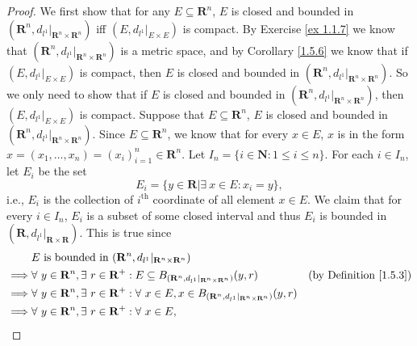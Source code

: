 \begin{proof}
    We first show that for any \(E \subseteq \mathbf{R}^n\), \(E\) is closed and bounded in \((\mathbf{R}^n, d_{l^1}|_{\mathbf{R}^n \times \mathbf{R}^n})\) iff \((E, d_{l^1}|_{E \times E})\) is compact.
    By Exercise \ref{ex 1.1.7} we know that \((\mathbf{R}^n, d_{l^1}|_{\mathbf{R}^n \times \mathbf{R}^n})\) is a metric space, and by Corollary \ref{1.5.6} we know that if \((E, d_{l^1}|_{E \times E})\) is compact, then \(E\) is closed and bounded in \((\mathbf{R}^n, d_{l^1}|_{\mathbf{R}^n \times \mathbf{R}^n})\).
    So we only need to show that if \(E\) is closed and bounded in \((\mathbf{R}^n, d_{l^1}|_{\mathbf{R}^n \times \mathbf{R}^n})\), then \((E, d_{l^1}|_{E \times E})\) is compact.
    Suppose that \(E \subseteq \mathbf{R}^n\), \(E\) is closed and bounded in \((\mathbf{R}^n, d_{l^1}|_{\mathbf{R}^n \times \mathbf{R}^n})\).
    Since \(E \subseteq \mathbf{R}^n\), we know that for every \(x \in E\), \(x\) is in the form \(x = (x_1, \dots, x_n) = (x_i)_{i = 1}^n \in \mathbf{R}^n\).
    Let \(I_n = \{i \in \mathbf{N} : 1 \leq i \leq n\}\).
    For each \(i \in I_n\), let \(E_i\) be the set
    \[
        E_i = \{y \in \mathbf{R} | \exists\ x \in E : x_i = y\},
    \]
    i.e., \(E_i\) is the collection of \(i^{\text{th}}\) coordinate of all element \(x \in E\).
    We claim that for every \(i \in I_n\), \(E_i\) is a subset of some closed interval and thus \(E_i\) is bounded in \((\mathbf{R}, d_{l^1}|_{\mathbf{R} \times \mathbf{R}})\).
    This is true since
    \begin{align*}
                 & E \text{ is bounded in } (\mathbf{R}^n, d_{l^1}|_{\mathbf{R}^n \times \mathbf{R}^n})                                                                                                          \\
        \implies & \forall\ y \in \mathbf{R}^n, \exists\ r \in \mathbf{R}^+ : E \subseteq B_{(\mathbf{R}^n, d_{l^1}|_{\mathbf{R}^n \times \mathbf{R}^n})}(y, r)             & \text{(by Definition \ref{1.5.3})} \\
        \implies & \forall\ y \in \mathbf{R}^n, \exists\ r \in \mathbf{R}^+ : \forall\ x \in E, x \in B_{(\mathbf{R}^n, d_{l^1}|_{\mathbf{R}^n \times \mathbf{R}^n})}(y, r)                                      \\
        \implies & \forall\ y \in \mathbf{R}^n, \exists\ r \in \mathbf{R}^+ : \forall\ x \in E,                                                                                                                  \\

\end{align*}
\end{proof}
